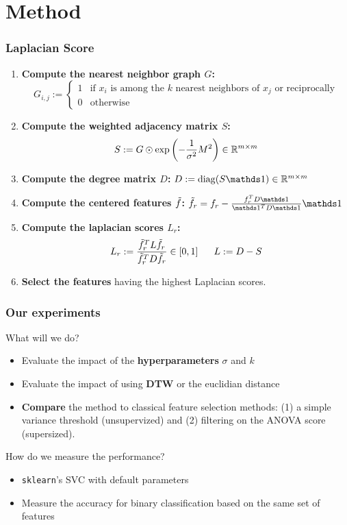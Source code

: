 \documentclass{beamer}
\begin{document}
\section{Method}
\begin{frame}
\frametitle{Laplacian Score}

\begin{enumerate}
    \item \textbf{Compute the nearest neighbor graph $G$:} 
    $$G_{i,j} := \begin{cases} 
        1 & \text{if $x_i$ is among the $k$ nearest neighbors of $x_j$ or reciprocally} \\
        0 & \text{otherwise}
    \end{cases}$$
    \item \textbf{Compute the weighted adjacency matrix $S$:}
    $$S := G \odot \exp\left(- \frac 1 {\sigma^2} M^2 \right) \in \mathbb{R}^{m\times m}$$
    \item \textbf{Compute the degree matrix $D$:}
    $
        D := \diag(S\one) \in \RR^{m\times m}
    $
    \item \textbf{Compute the centered features $\Tilde{f}$:} 
    $
        \Tilde{f}_r = f_r - \frac {f_r^T D \one} {\one^T D \one} \one
    $
    \item \textbf{Compute the laplacian scores $L_r$:} 
    $$L_r := \frac{\Tilde{f}_r^T L \Tilde{f}_r}{\Tilde{f}_r^T D \Tilde{f}_r} \in [0, 1] \ \ \ \ \ L := D - S$$
    \item \textbf{Select the features} having the highest Laplacian scores.
\end{enumerate}

\end{frame}
\begin{frame}
\frametitle{Our experiments}

What will we do?
\begin{itemize}
    \item Evaluate the impact of the \textbf{hyperparameters} $\sigma$ and $k$
    \item Evaluate the impact of using \textbf{DTW} or the euclidian distance
    \item \textbf{Compare} the method to classical feature selection methods: (1) a simple variance threshold (unsupervized) and (2) filtering on the ANOVA score \cite{scheffe_analysis_1999} (supersized).
\end{itemize}

\medskip

How do we measure the performance?
\begin{itemize}
    \item \texttt{sklearn}'s SVC with default parameters
    \item Measure the accuracy for binary classification based on the same set of features
\end{itemize}

\end{frame}
\end{document}
